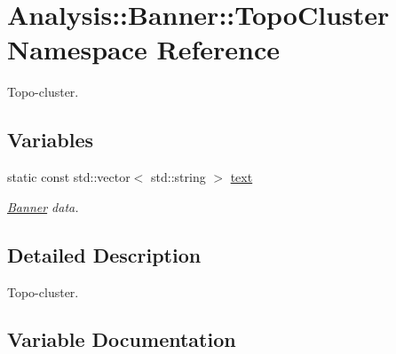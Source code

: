 \hypertarget{namespaceAnalysis_1_1Banner_1_1TopoCluster}{}\section{Analysis\+:\+:Banner\+:\+:Topo\+Cluster Namespace Reference}
\label{namespaceAnalysis_1_1Banner_1_1TopoCluster}


Topo-\/cluster.  


\subsection*{Variables}
\begin{DoxyCompactItemize}
\item 
static const std\+::vector$<$ std\+::string $>$ \hyperlink{namespaceAnalysis_1_1Banner_1_1TopoCluster_abceaa1529e8c7c09c75e73fefdbcf8f1}{text}
\begin{DoxyCompactList}\small\item\em \hyperlink{namespaceAnalysis_1_1Banner}{Banner} data. \end{DoxyCompactList}\end{DoxyCompactItemize}


\subsection{Detailed Description}
Topo-\/cluster. 

\subsection{Variable Documentation}
